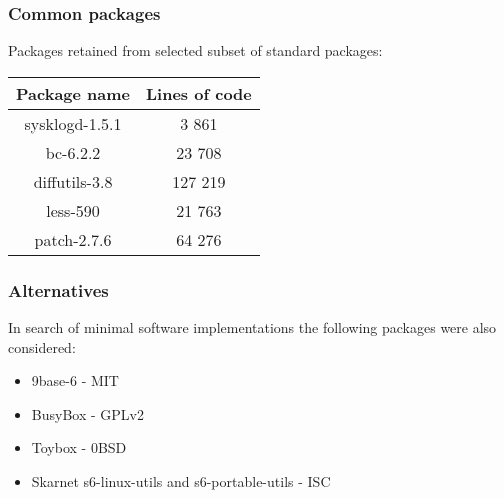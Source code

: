 \subsubsection{Common packages}

Packages retained from selected subset of standard packages:

\begin{center}
    \begin{tabular}{|c||c|}
        \hline
        Package name & Lines of code \\
        \hline
        \hline
        sysklogd-1.5.1 & 3 861 \\
        \hline
        bc-6.2.2 & 23 708 \\
        \hline        
        diffutils-3.8 & 127 219 \\
        \hline
        less-590 & 21 763 \\
        \hline
        patch-2.7.6 & 64 276 \\
        \hline
    \end{tabular}
\end{center}

\subsubsection{Alternatives}

In search of minimal software implementations the following packages were also considered:

\begin{itemize}
    \item 9base-6 \cite{9base} - MIT
    \item BusyBox \cite{busybox} - GPLv2
    \item Toybox \cite{toybox} - 0BSD
    \item Skarnet s6-linux-utils \cite{s6-linux} and s6-portable-utils \cite{s6-portable} - ISC
\end{itemize}
